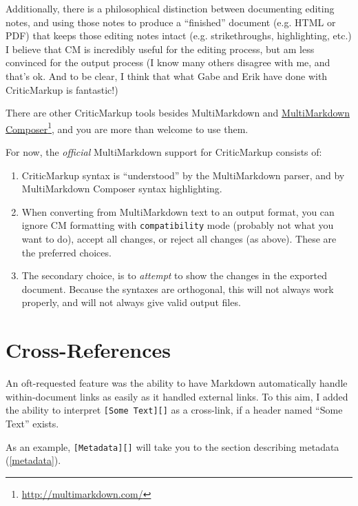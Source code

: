 Additionally, there is a philosophical distinction between documenting editing notes, and using those notes to produce a ``finished'' document (e.g. HTML or PDF) that keeps those editing notes intact (e.g. strikethroughs, highlighting, etc.) I believe that CM is incredibly useful for the editing process, but am less convinced for the output process (I know many others disagree with me, and that's ok. And to be clear, I think that what Gabe and Erik have done with CriticMarkup is fantastic!)

There are other CriticMarkup tools besides MultiMarkdown and \href{http://multimarkdown.com/}{MultiMarkdown Composer}\footnote{\href{http://multimarkdown.com/}{http:\slash{}\slash{}multimarkdown.com\slash{}}}, and you are more than welcome to use them.

For now, the \emph{official} MultiMarkdown support for CriticMarkup consists of:

\begin{enumerate}
\item CriticMarkup syntax is ``understood'' by the MultiMarkdown parser, and by MultiMarkdown Composer syntax highlighting.

\item When converting from MultiMarkdown text to an output format, you can ignore CM formatting with \texttt{compatibility} mode (probably not what you want to do), accept all changes, or reject all changes (as above). These are the preferred choices.

\item The secondary choice, is to \emph{attempt} to show the changes in the exported document. Because the syntaxes are orthogonal, this will not always work properly, and will not always give valid output files.

\end{enumerate}

\section{Cross-References}
\label{cross-references}

An oft-requested feature was the ability to have Markdown automatically handle
within-document links as easily as it handled external links. To this aim, I
added the ability to interpret \texttt{[Some Text][]} as a cross-link, if a header
named ``Some Text'' exists.

As an example, \texttt{[Metadata][]} will take you to the
section describing metadata (\autoref{metadata}).

